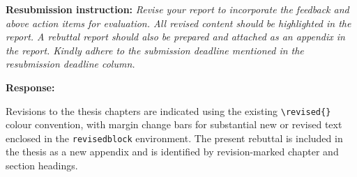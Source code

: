 \noindent\textbf{Resubmission instruction:} \textit{Revise your report to
incorporate the feedback and above action items for evaluation. All
revised content should be highlighted in the report. A rebuttal report
should also be prepared and attached as an appendix in the report.
Kindly adhere to the submission deadline mentioned in the resubmission
deadline column.}

\vspace{\baselineskip}

\noindent\textbf{Response:}

Revisions to the thesis chapters are indicated using the existing
\texttt{\textbackslash revised\{\}} colour convention, with margin
change bars for substantial new or revised text enclosed in the
\texttt{revisedblock} environment. The present rebuttal is included in
the thesis as a new appendix and is identified by revision-marked
chapter and section headings.
